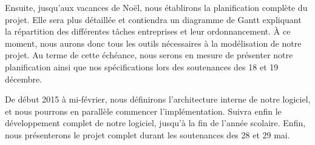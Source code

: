 		Ensuite, jusqu'aux vacances de Noël, nous établirons la planification complète du projet. Elle sera plus détaillée et contiendra un diagramme de Gantt expliquant la répartition des différentes tâches entreprises et leur ordonnancement. À ce moment, nous aurons donc tous les outils nécessaires à la modélisation de notre projet. Au terme de cette échéance, nous serons en mesure de présenter notre planification ainsi que nos spécifications lors des soutenances des 18 et 19 décembre.

		De début 2015 à mi-février, nous définirons l'architecture interne de notre logiciel, et nous pourrons en parallèle commencer l'implémentation. Suivra enfin le développement complet de notre logiciel, jusqu'à la fin de l'année scolaire. Enfin, nous présenterons le projet complet durant les soutenances des 28 et 29 mai.

	    
